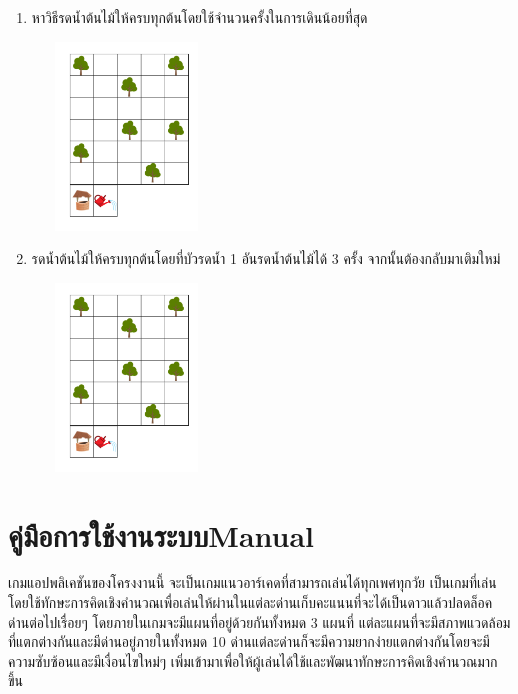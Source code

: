 \begin{enumerate}
\begin{center}
    \end{center}
    \item หาวิธีรดน้ำต้นไม้ให้ครบทุกต้นโดยใช้จำนวนครั้งในการเดินน้อยที่สุด
    \begin{center}
        \includegraphics[width=5cm, height=5cm]{pic-toro/exam/treemed.png}
    \end{center}
    \item รดน้ำต้นไม้ให้ครบทุกต้นโดยที่บัวรดน้ำ 1 อันรดน้ำต้นไม้ได้ 3 ครั้ง จากนั้นต้องกลับมาเติมใหม่
    \begin{center}
        \includegraphics[width=5cm, height=5cm]{pic-toro/exam/treehard.png}
    \end{center} 
\end{enumerate}

\chapter{\ifcpe คู่มือการใช้งานระบบ\else Manual\fi}

เกมแอปพลิเคชันของโครงงานนี้ จะเป็นเกมแนวอาร์เคดที่สามารถเล่นได้ทุกเพศทุกวัย 
เป็นเกมที่เล่นโดยใช้ทักษะการคิดเชิงคำนวณเพื่อเล่นให้ผ่านในแต่ละด่านเก็บคะแนนที่จะได้เป็นดาวแล้วปลดล็อคด่านต่อไปเรื่อยๆ 
โดยภายในเกมจะมีแผนที่อยู่ด้วยกันทั้งหมด 3 แผนที่ แต่ละแผนที่จะมีสภาพแวดล้อมที่แตกต่างกันและมีด่านอยู่ภายในทั้งหมด 10 
ด่านแต่ละด่านก็จะมีความยากง่ายแตกต่างกันโดยจะมีความซับซ้อนและมีเงื่อนไขใหม่ๆ
เพิ่มเข้ามาเพื่อให้ผู้เล่นได้ใช้และพัฒนาทักษะการคิดเชิงคำนวณมากขึ้น

